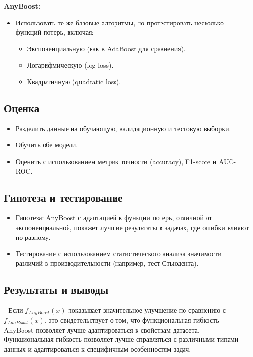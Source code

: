 \textbf{AnyBoost:}
\begin{itemize}
    \item Использовать те же базовые алгоритмы, но протестировать несколько функций потерь, включая:
          \begin{itemize}
              \item Экспоненциальную (как в AdaBoost для сравнения).
              \item Логарифмическую (log loss).
              \item Квадратичную (quadratic loss).
          \end{itemize}
\end{itemize}

\subsection*{Оценка}
\begin{itemize}
    \item Разделить данные на обучающую, валидационную и тестовую выборки.
    \item Обучить обе модели.
    \item Оценить с использованием метрик точности (accuracy), F1-score и AUC-ROC.
\end{itemize}

\subsection*{Гипотеза и тестирование}
\begin{itemize}
    \item Гипотеза: AnyBoost с адаптацией к функции потерь, отличной от экспоненциальной, покажет лучшие результаты в задачах, где ошибки влияют по-разному.
    \item Тестирование с использованием статистического анализа значимости различий в производительности (например, тест Стьюдента).
\end{itemize}

\subsection*{Результаты и выводы}

- Если $f_{AnyBoost}(x)$ показывает значительное улучшение по сравнению с $f_{AdaBoost}(x)$, это свидетельствует о том, что функциональная гибкость AnyBoost позволяет лучше адаптироваться к свойствам датасета.
- Функциональная гибкость позволяет лучше справляться с различными типами данных и адаптироваться к специфичным особенностям задач.

